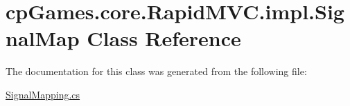 \hypertarget{classcp_games_1_1core_1_1_rapid_m_v_c_1_1impl_1_1_signal_map}{}\section{cp\+Games.\+core.\+Rapid\+M\+V\+C.\+impl.\+Signal\+Map Class Reference}
\label{classcp_games_1_1core_1_1_rapid_m_v_c_1_1impl_1_1_signal_map}


The documentation for this class was generated from the following file\+:\begin{DoxyCompactItemize}
\item 
\mbox{\hyperlink{_signal_mapping_8cs}{Signal\+Mapping.\+cs}}\end{DoxyCompactItemize}
